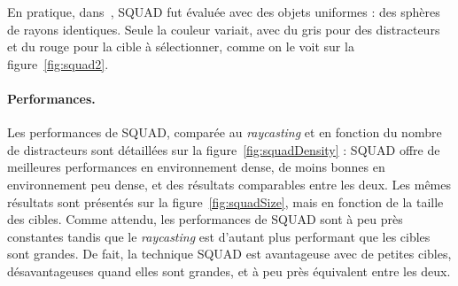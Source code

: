 	En pratique, dans~\cite{kopper2011rapid}, SQUAD fut évaluée avec des objets uniformes : des sphères de rayons identiques. Seule la couleur variait, avec du gris pour des distracteurs et du rouge pour la cible à sélectionner, comme on le voit sur la figure~\ref{fig:squad2}. 
	
	\paragraph{Performances.}
	Les performances de SQUAD, comparée au \emph{raycasting} et en fonction du nombre de distracteurs sont détaillées sur la figure~\ref{fig:squadDensity} : SQUAD offre de meilleures performances en environnement dense, de moins bonnes en environnement peu dense, et des résultats comparables entre les deux. Les mêmes résultats sont présentés sur la figure~\ref{fig:squadSize}, mais en fonction de la taille des cibles. Comme attendu, les performances de SQUAD sont à peu près constantes tandis que le \emph{raycasting} est d'autant plus performant que les cibles sont grandes. De fait, la technique SQUAD est avantageuse avec de petites cibles, désavantageuses quand elles sont grandes, et à peu près équivalent entre les deux.
	
